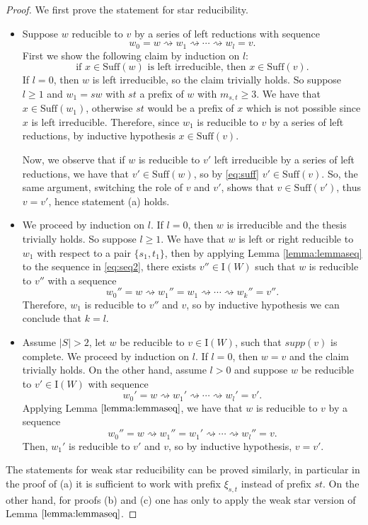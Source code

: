 \documentclass{amsart}
\newcommand{\su}{\mathrm{Suff}}
\newcommand{\I}{\mathrm{I}}
\newcommand{\red}{\rightsquigarrow}
\theoremstyle{definition}
\begin{document}
\begin{proof}
   We first prove the statement for star reducibility.
    \begin{itemize} 
        \item[(a)] %
        Suppose $w$ reducible to $v$ by a series of left reductions with sequence \[w_0=w\red w_1\red \cdots \red w_l=v.\]
        First we show the following claim by induction on $l$:  \begin{equation}              \label{eq:suff}
                     \mbox{if }x\in \su(w) \mbox{ is left irreducible, then }x\in \su(v).
                    \end{equation} If $l=0$, then $w$ is left irreducible, so the claim trivially holds. So suppose $l\ge 1$ and $w_1=sw$ with $st$ a prefix of $w$ with $m_{s,t}\ge 3$. We have that $x\in \su(w_1)$, otherwise $st$ would be a prefix of $x$ which is not possible since $x$ is left irreducible. Therefore, since $w_1$ is reducible to $v$ by a series of left reductions, by inductive hypothesis $x\in \su(v)$. 
    
                    Now, we observe that if $w$ is reducible to $v'$ left irreducible by a series of left reductions, we have that $v'\in \su(w)$, so by \eqref{eq:suff} $v'\in \su(v)$. So, the same argument, switching the role of $v$ and $v'$, shows that $v\in \su(v')$, thus $v=v'$, hence statement (a) holds. 
       \item[(b)] We proceed by induction on $l$. If $l=0$, then $w$ is irreducible and the thesis trivially holds. So suppose $l\ge 1$. We have that $w$ is left or right reducible to $w_1$ with respect to a pair $\{s_1,t_1\}$, then by applying Lemma \ref{lemma:lemmaseq} to the sequence in \eqref{eq:seq2}, there exists $v''\in \I(W)$ such that $w$ is reducible to $v''$ with a sequence \[w_0''=w\red w_1''=w_1\red \cdots \red w_k''=v''.\] Therefore, $w_1$ is reducible to $v''$ and $v$, so by inductive hypothesis we can conclude that $k=l$. 
       \item[(c)] Assume $|S|>2$, let $w$ be reducible to $v\in \I(W)$, such that $supp(v)$ is complete.
       We proceed by induction on $l$. If $l=0$, then $w=v$ and the claim trivially holds. On the other hand, assume $l>0$ and suppose $w$ be reducible to $v'\in \I(W)$ with sequence \[ w_0'=w\red w_1'\red \cdots \red w_l'=v'.\] Applying Lemma $\ref{lemma:lemmaseq}$, we have that $w$ is reducible to $v$ by a sequence \[w_0''=w\red w_1''=w_1'\red \cdots \red w_l''=v.\] Then, $w_1'$ is reducible to $v'$ and $v$, so by inductive hypothesis, $v=v'$.
    \end{itemize}  
    The statements for weak star reducibility can be proved similarly, in particular in the proof of (a) it is sufficient to work with prefix $\xi_{s,t}$ instead of prefix $st$. On the other hand, for proofs (b) and (c) one has only to apply the weak star version of Lemma $\ref{lemma:lemmaseq}$. 
\end{proof}
\end{document}
